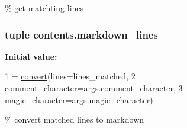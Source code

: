 \% get matchting lines 

\hypertarget{namespacecontents_af2672fb8b3e40d03ea79e4dcc65d8b39}{
\subsubsection[{markdown\+\_\+lines}]{\setlength{\rightskip}{0pt plus 5cm}tuple contents.\+markdown\+\_\+lines}}\label{namespacecontents_af2672fb8b3e40d03ea79e4dcc65d8b39}
{\bfseries Initial value\+:}
\begin{DoxyCode}
1 = \hyperlink{namespacecontents_a0d85f8135ed9472f4f2e3b5f7283e824}{convert}(lines=lines\_matched,
2                              comment\_character=args.comment\_character,
3                              magic\_character=args.magic\_character)
\end{DoxyCode}


\% convert matched lines to markdown 

